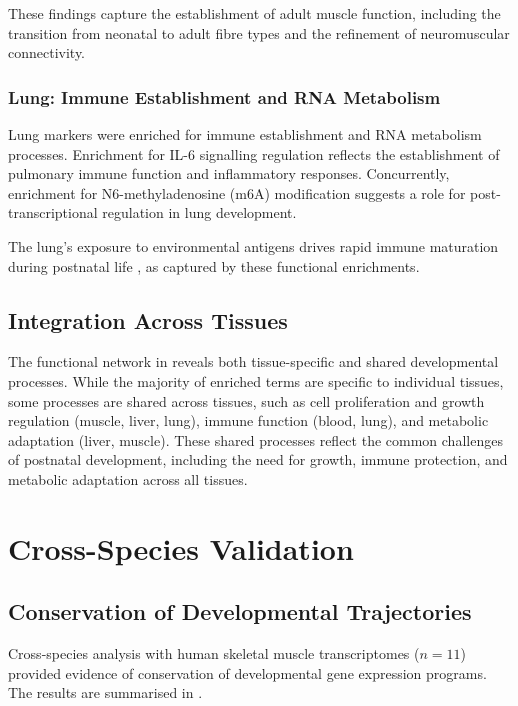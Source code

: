 These findings capture the establishment of adult muscle function, including the transition from neonatal to adult fibre types \parencite{lefaucheur_pattern_1995, lefaucheur_second_2010} and the refinement of neuromuscular connectivity.

\subsubsection{Lung: Immune Establishment and RNA Metabolism}

Lung markers were enriched for immune establishment and RNA metabolism processes. Enrichment for IL-6 signalling regulation reflects the establishment of pulmonary immune function and inflammatory responses. Concurrently, enrichment for N6-methyladenosine (m6A) modification \parencite{wang_n6-methyladenosine_2014} suggests a role for post-transcriptional regulation in lung development.

The lung's exposure to environmental antigens drives rapid immune maturation during postnatal life \parencite{georgountzou_postnatal_2017}, as captured by these functional enrichments.

\subsection{Integration Across Tissues}

The functional network in  reveals both tissue-specific and shared developmental processes. While the majority of enriched terms are specific to individual tissues, some processes are shared across tissues, such as cell proliferation and growth regulation (muscle, liver, lung), immune function (blood, lung), and metabolic adaptation (liver, muscle). These shared processes reflect the common challenges of postnatal development, including the need for growth, immune protection, and metabolic adaptation across all tissues.


\section{Cross-Species Validation}\label{sec:results:crossspecies}

\subsection{Conservation of Developmental Trajectories}

Cross-species analysis with human skeletal muscle transcriptomes \parencite{schaiter_molecular_2024} ($n = 11$) provided evidence of conservation of developmental gene expression programs. The results are summarised in .

